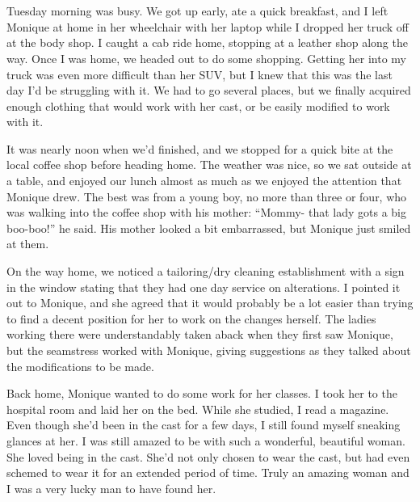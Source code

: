 \chapter{~}
Tuesday morning was busy. We got up early, ate a quick breakfast, and I left Monique at
home in her wheelchair with her laptop while I dropped her truck off at the body shop. I caught
a cab ride home, stopping at a leather shop along the way. Once I was home, we headed out to do
some shopping. Getting her into my truck was even more difficult than her SUV, but I knew that
this was the last day I'd be struggling with it. We had to go several places, but we finally
acquired enough clothing that would work with her cast, or be easily modified to work with it.

It was nearly noon when we'd finished, and we stopped for a quick bite at the local coffee
shop before heading home. The weather was nice, so we sat outside at a table, and enjoyed our
lunch almost as much as we enjoyed the attention that Monique drew. The best was from a young
boy, no more than three or four, who was walking into the coffee shop with his mother: ``Mommy-
that lady gots a big boo-boo!'' he said. His mother looked a bit embarrassed, but Monique just
smiled at them.

On the way home, we noticed a tailoring/dry cleaning establishment with a sign in the window
stating that they had one day service on alterations. I pointed it out to Monique, and she
agreed that it would probably be a lot easier than trying to find a decent position for her to
work on the changes herself. The ladies working there were understandably taken aback when they
first saw Monique, but the seamstress worked with Monique, giving suggestions as they talked
about the modifications to be made.

Back home, Monique wanted to do some work for her classes. I took her to the hospital room
and laid her on the bed. While she studied, I read a magazine. Even though she'd been in the
cast for a few days, I still found myself sneaking glances at her. I was still amazed to be with
such a wonderful, beautiful woman. She loved being in the cast. She'd not only chosen to wear
the cast, but had even schemed to wear it for an extended period of time. Truly an amazing woman
and I was a very lucky man to have found her.

